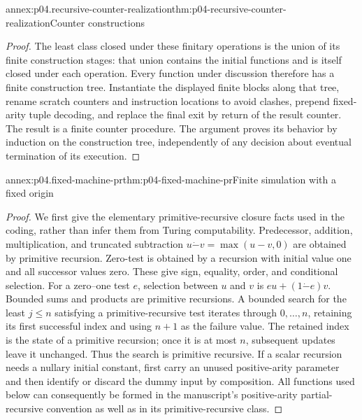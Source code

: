 \begin{annexitem}{annex:p04.recursive-counter-realization}{thm:p04-recursive-counter-realization}{Counter constructions}
\begin{proof}
The least class closed under these finitary operations is the union of
its finite construction stages: that union contains the initial
functions and is itself closed under each operation. Every function
under discussion therefore has a finite construction tree. Instantiate
the displayed finite blocks along that tree, rename scratch counters and
instruction locations to avoid clashes, prepend fixed-arity tuple
decoding, and replace the final exit by return of the result counter.
The result is a finite counter procedure. The argument proves its
behavior by induction on the construction tree, independently of any
decision about eventual termination of its execution.
\end{proof}
\end{annexitem}

\begin{annexitem}{annex:p04.fixed-machine-pr}{thm:p04-fixed-machine-pr}{Finite simulation with a fixed origin}
\begin{proof}
We first give the elementary primitive-recursive closure facts used in
the coding, rather than infer them from Turing computability.
Predecessor, addition, multiplication, and truncated subtraction
\(u\mathbin{\dot{-}}v=\max(u-v,0)\) are obtained by primitive recursion.
Zero-test is obtained by a recursion with initial value one and all
successor values zero. These give sign, equality, order, and conditional
selection. For a zero--one test \(e\), selection between \(u\) and \(v\)
is \(eu+(1\mathbin{\dot{-}}e)v\).
Bounded sums and products are primitive recursions. A bounded search
for the least \(j\leq n\) satisfying a primitive-recursive test iterates
through \(0,\ldots,n\), retaining its first successful index and using
\(n+1\) as the failure value. The retained index is the state of a
primitive recursion; once it is at most \(n\), subsequent updates leave
it unchanged. Thus the search is primitive recursive.
If a scalar recursion needs a nullary initial constant, first carry an
unused positive-arity parameter and then identify or discard the dummy
input by composition. All functions used below can consequently be
formed in the manuscript's positive-arity partial-recursive convention
as well as in its primitive-recursive class.


\end{proof}
\end{annexitem}
